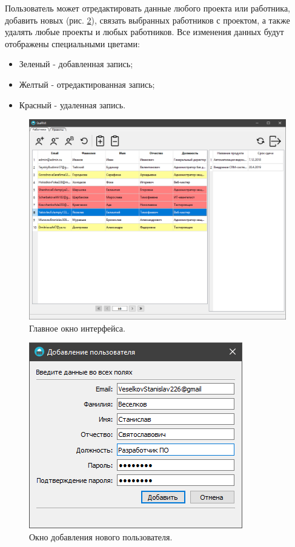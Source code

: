 \documentclass[14pt, a4paper]{extarticle}
\begin{document}
    Пользователь может отредактировать данные любого проекта или работника, добавить новых (рис. \ref{fig:add_user_window_win}), связать выбранных работников с проектом, а также удалять любые проекты и любых работников. Все изменения данных будут отображены специальными цветами:
    \begin{itemize}
        \item Зеленый - добавленная запись;
        \item Желтый - отредактированная запись;
        \item Красный - удаленная запись.
    \end{itemize}

    \begin{figure}[h]
        \centering
        \includegraphics[width=1\linewidth]{img/main_window_win.png}
        \caption{Главное окно интерфейса.}
        \label{fig:main_window_win}
    \end{figure}

    \begin{figure}[h]
        \centering
        \includegraphics[width=0.4\linewidth]{img/add_user_window_win.png}
        \caption{Окно добавления нового пользователя.}
        \label{fig:add_user_window_win}
    \end{figure}
    
\end{document}
